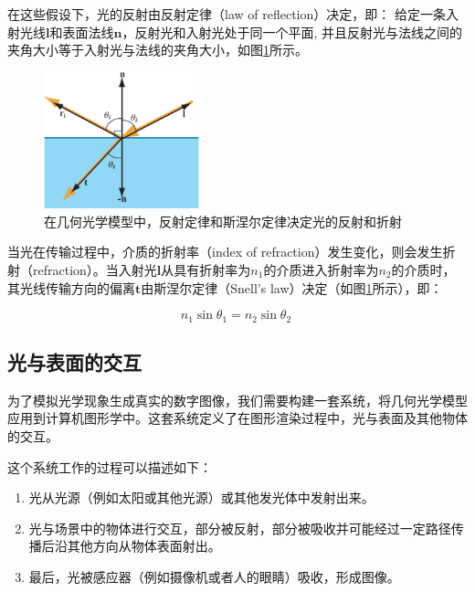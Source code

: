 在这些假设下，光的反射由反射定律（law of reflection）决定，即： 给定一条入射光线$\mathbf{l}$和表面法线$\mathbf{n}$，反射光和入射光处于同一个平面, 并且反射光与法线之间的夹角大小等于入射光与法线的夹角大小，如图\ref{f:intro-Ray-optics-model}所示。

\begin{figure}
\sidecaption
	\includegraphics[width=0.4\textwidth]{graphics/gi/ray-optics-1}
	\caption{在几何光学模型中，反射定律和斯涅尔定律决定光的反射和折射}
	\label{f:intro-Ray-optics-model}
\end{figure}

当光在传输过程中，介质的折射率（index of refraction）发生变化，则会发生折射（refraction）。当入射光$\mathbf{l}$从具有折射率为$n_1$的介质进入折射率为$n_2$的介质时， 其光线传输方向的偏离$\mathbf{t}$由斯涅尔定律（Snell's law）决定（如图\ref{f:intro-Ray-optics-model}所示），即：

\begin{equation}\label{eq:intro-snell-Law}
	n_1\sin\theta_1 = n_2\sin\theta_2\ 	
\end{equation}





\subsection{光与表面的交互}
为了模拟光学现象生成真实的数字图像，我们需要构建一套系统，将几何光学模型应用到计算机图形学中。这套系统定义了在图形渲染过程中，光与表面及其他物体的交互。

这个系统工作的过程可以描述如下：

\begin{enumerate}
	\item 光从光源（例如太阳或其他光源）或其他发光体中发射出来。
	\item 光与场景中的物体进行交互，部分被反射，部分被吸收并可能经过一定路径传播后沿其他方向从物体表面射出。
	\item 最后，光被感应器（例如摄像机或者人的眼睛）吸收，形成图像。
\end{enumerate}

